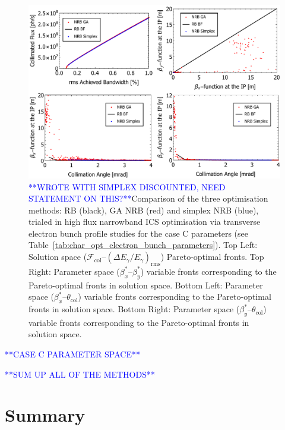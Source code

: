 \documentclass[../main.tex]{subfiles}
\begin{document}
\begin{figure}[!h]
\centering
\includegraphics[width=\textwidth]{Figures/Optimisation_and_Characterisation_of_Inverse_Compton_Scattering_Sources/CaseCoptcomp.pdf}
\caption{\textcolor{blue}{**WROTE WITH SIMPLEX DISCOUNTED, NEED STATEMENT ON THIS?**}Comparison of the three optimisation methods: RB (black), GA NRB (red) and simplex NRB (blue), trialed in high flux narrowband ICS optimisation via transverse electron bunch profile studies for the case C parameters (see Table~\ref{tab:char_opt_electron_bunch_parameters}). Top Left: Solution space ($\mathcal{F}_{\mathrm{col}}$--$\left(\Delta E_{\gamma}/E_{\gamma}\right)_{\mathrm{rms}}$) Pareto-optimal fronts. Top Right: Parameter space ($\beta_{x}^{*}$--$\beta_{y}^{*}$) variable fronts corresponding to the Pareto-optimal fronts in solution space. Bottom Left: Parameter space ($\beta_{x}^{*}$--$\theta_{\mathrm{col}}$) variable fronts corresponding to the Pareto-optimal fronts in solution space. Bottom Right: Parameter space ($\beta_{y}^{*}$--$\theta_{\mathrm{col}}$) variable fronts corresponding to the Pareto-optimal fronts in solution space.}
\label{fig:case_C_optimisation_comparision}
\end{figure}

\textcolor{blue}{**CASE C PARAMETER SPACE**}

\textcolor{blue}{**SUM UP ALL OF THE METHODS**}

\section{Summary}
\end{document}
